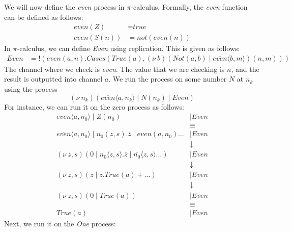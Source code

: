 \documentclass[a4paper, openany]{memoir}
\theoremstyle{definition}
\begin{document}
    We will now define the \textit{even} process in $\pi$-calculus. Formally, the \textit{even} function can be defined as follows:
    \begin{align*}
        \textit{even}(Z) &= \textit{true} \\
        \textit{even}(S(n)) &= \textit{not}(\textit{even}(n))
    \end{align*}
    In $\pi$-calculus, we can define \textit{Even} using replication. This is given as follows:
    \begin{align*}
        \textit{Even} &= !(\textit{even}(a, n).\textit{Cases}(\textit{True}(a), 
            (\nu \ b)(\textit{Not}(a, b) \mid \overline{\textit{even}} \langle b, m \rangle)(n, m)
        ))
    \end{align*}
    The channel where we check is \textit{even}. The value that we are checking is $n$, and the result is outputted into channel $a$. We run the process on some number $N$ at $n_k$ using the process
    \[(\nu \ n_k)(\overline{\textit{even}}\langle a, n_k\rangle \mid N(n_k) \mid \textit{Even})\]
    For instance, we can run it on the zero process as follows:
    \begin{align*}
        \overline{\textit{even}} \langle a, n_0\rangle \mid Z(n_0) &\mid \textit{Even} \\
        &\equiv \\
        \overline{\textit{even}} \langle a, n_0\rangle \mid n_0(z, s).\overline{z} \mid \textit{even}(a, n_0)\dots &\mid \textit{Even} \\
        &\downarrow \\
        (\nu \ z, s) (0 \mid n_0\langle z, s \rangle.\overline{z} \mid \overline{n_0}\langle z, s \rangle\dots) &\mid \textit{Even} \\
        &\downarrow \\
        (\nu \ z, s)(z \mid z.\textit{True}(a) + \dots) &\mid \textit{Even} \\
        &\downarrow \\
        (\nu \ z, s)(0 \mid \textit{True}(a)) &\mid \textit{Even} \\
        &\equiv \\
        \textit{True}(a) &\mid \textit{Even}
    \end{align*}
    Next, we run it on the \textit{One} process:
\end{document}
